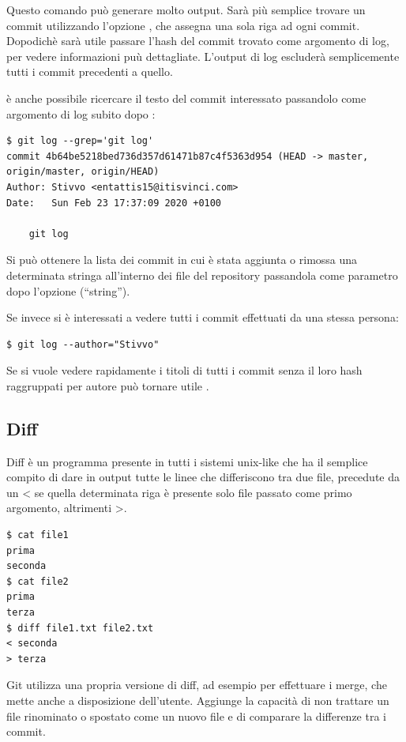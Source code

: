 \documentclass{article}
\begin{document}
Questo comando può generare molto output. Sarà più semplice trovare un commit
utilizzando l'opzione , che assegna una sola
riga ad ogni commit. Dopodichè sarà utile passare l'hash del commit trovato come
argomento di log, per vedere informazioni puù dettagliate. L'output di log
escluderà semplicemente tutti i commit precedenti a quello.

è anche possibile ricercare il testo del commit interessato passandolo come
argomento di log subito dopo :

\begin{verbatim}
$ git log --grep='git log'
commit 4b64be5218bed736d357d61471b87c4f5363d954 (HEAD -> master, origin/master, origin/HEAD)
Author: Stivvo <entattis15@itisvinci.com>
Date:   Sun Feb 23 17:37:09 2020 +0100

    git log
\end{verbatim}

Si può ottenere la lista dei commit in cui è stata aggiunta o rimossa una
determinata stringa all'interno dei file del repository passandola come
parametro dopo l'opzione  (``string'').

Se invece si è interessati a vedere tutti i commit effettuati da una stessa
persona:

\begin{verbatim}
$ git log --author="Stivvo"
\end{verbatim}

Se si vuole vedere rapidamente i titoli di tutti i commit senza il loro hash 
raggruppati per autore può tornare utile .

\subsection{Diff}
Diff è un programma presente in tutti i sistemi unix-like che ha il semplice
compito di dare in output tutte le linee che differiscono tra due file,
precedute da un < se quella determinata riga è presente solo file passato come
primo argomento, altrimenti >.

\begin{verbatim}
$ cat file1
prima
seconda
$ cat file2
prima
terza
$ diff file1.txt file2.txt
< seconda
> terza
\end{verbatim}

Git utilizza una propria versione di diff, ad esempio per effettuare i merge,
che mette anche a disposizione dell'utente. Aggiunge la capacità di non trattare
un file rinominato o spostato come un nuovo file e di comparare la differenze
tra i commit.
\end{document}
